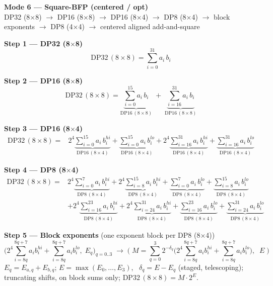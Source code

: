 \documentclass[fleqn]{article}
\newcommand{\DPop}[3]{\mathrm{DP#1}\,(#2\!\times\!#3)}
\begin{document}
\begin{center}
{\LARGE \textbf{Mode 6 --- Square-BFP (centered / opt)}}\\[4pt]
{\large DP32 (8$\times$8) $\rightarrow$ DP16 (8$\times$8) $\rightarrow$ DP16 (8$\times$4) $\rightarrow$ DP8 (8$\times$4) $\rightarrow$ block exponents $\rightarrow$ DP8 (4$\times$4) $\rightarrow$ centered aligned add-and-square}
\end{center}

\textbf{Step 1 --- DP32 (8$\times$8)}
\[
\DPop{32}{8}{8} = \sum_{i=0}^{31} a_i \, b_i
\]

\textbf{Step 2 --- DP16 (8$\times$8)}
\[
\DPop{32}{8}{8}
  = \underbrace{\sum_{i=0}^{15} a_i \, b_i}_{\DPop{16}{8}{8}}
  \; + \; \underbrace{\sum_{i=16}^{31} a_i \, b_i}_{\DPop{16}{8}{8}}
\]

\textbf{Step 3 --- DP16 (8$\times$4)}
\begin{align*}
\DPop{32}{8}{8} = {}
  & 2^{4}\underbrace{\sum_{i=0}^{15} a_i \, b_i^{hi}}_{\DPop{16}{8}{4}}
  + \underbrace{\sum_{i=0}^{15} a_i \, b_i^{lo}}_{\DPop{16}{8}{4}}
  + 2^{4}\underbrace{\sum_{i=16}^{31} a_i \, b_i^{hi}}_{\DPop{16}{8}{4}}
  + \underbrace{\sum_{i=16}^{31} a_i \, b_i^{lo}}_{\DPop{16}{8}{4}}
\end{align*}

\textbf{Step 4 --- DP8 (8$\times$4)}
\begin{align*}
\DPop{32}{8}{8} = {}
  & 2^{4}\underbrace{\sum_{i=0}^{7} a_i \, b_i^{hi}}_{\DPop{8}{8}{4}}
  + 2^{4}\underbrace{\sum_{i=8}^{15} a_i \, b_i^{hi}}_{\DPop{8}{8}{4}}
  + \underbrace{\sum_{i=0}^{7} a_i \, b_i^{lo}}_{\DPop{8}{8}{4}}
  + \underbrace{\sum_{i=8}^{15} a_i \, b_i^{lo}}_{\DPop{8}{8}{4}} \\[0.3em]
  & + 2^{4}\underbrace{\sum_{i=16}^{23} a_i \, b_i^{hi}}_{\DPop{8}{8}{4}}
  + 2^{4}\underbrace{\sum_{i=24}^{31} a_i \, b_i^{hi}}_{\DPop{8}{8}{4}}
  + \underbrace{\sum_{i=16}^{23} a_i \, b_i^{lo}}_{\DPop{8}{8}{4}}
  + \underbrace{\sum_{i=24}^{31} a_i \, b_i^{lo}}_{\DPop{8}{8}{4}}
\end{align*}

\textbf{Step 5 --- Block exponents}\quad
{\small(one exponent block per DP8 (8$\times$4))}
\[
\Big(2^{4}\!\!\sum_{i=8q}^{8q+7}\! a_i b_i^{hi} + \!\!\sum_{i=8q}^{8q+7}\! a_i b_i^{lo},\; E_q\Big)_{q=0..3}
\;\longrightarrow\;
\Big(\; M = \sum_{q=0}^{3} 2^{-\delta_q}\Big(2^{4}\!\!\sum_{i=8q}^{8q+7}\! a_i b_i^{hi} + \!\!\sum_{i=8q}^{8q+7}\! a_i b_i^{lo}\Big) ,\;\; E \;\Big)
\]
$E_q=E_{a,q}+E_{b,q}$; \quad $E=\max(E_0,\dots,E_3)$, \ $\delta_q=E-E_q$ (staged, telescoping); \quad truncating shifts, on block sums only; \quad $\DPop{32}{8}{8}=M\cdot2^{E}$.
\end{document}
